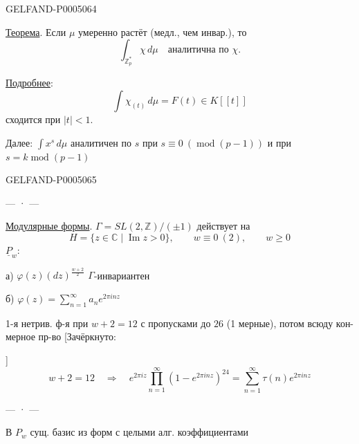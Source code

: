 \begin{GelfandAdjacentEvidence}{GELFAND-P000506}{4}


\uline{Теорема}. Если $\mu$ умеренно растёт (медл., чем инвар.), то
\[
\int_{\mathbb Z_p^*}\chi\,d\mu\quad\text{аналитична по $\chi$}.
\]

\uline{Подробнее}:
\[
\int\chi_{(t)}\,d\mu=F(t)\in K[[t]]
\]
сходится при $|t|<1$.

Далее: $\int x^s\,d\mu$ аналитичен по $s$ при $s\equiv0\ (\operatorname{mod}(p-1))$
и при $s=k\operatorname{mod}(p-1)$
\end{GelfandAdjacentEvidence}
\begin{GelfandAdjacentEvidence}{GELFAND-P000506}{5}


\begin{center}— · —\end{center}
\uline{Модулярные формы}. $\Gamma=SL(2,\mathbb Z)/(\pm1)$ действует на
\[
H=\{z\in\mathbb C\mid\operatorname{Im}z>0\},\qquad w\equiv0\ (2),\qquad w\geq0
\]
$\underline{P}_w$: 

а) $\varphi(z)(dz)^{\frac{w+2}{2}}$ $\Gamma$-инвариантен

б) $\varphi(z)=\displaystyle\sum_{n=1}^\infty a_ne^{2\pi inz}$

1-я нетрив. ф-я при $w+2=12$ с пропусками до $26$
(1 мерные), потом всюду кон-мерное пр-во
[Зачёркнуто: 
\end{GelfandAdjacentEvidence}
]
\[
w+2=12\quad\Longrightarrow\quad
e^{2\pi iz}\prod_{n=1}^\infty(1-e^{2\pi inz})^{24}
=\sum_{n=1}^\infty\tau(n)e^{2\pi inz}
\]
\begin{center}— · —\end{center}
В $P_w$ сущ. базис из форм с целыми алг. коэффициентами


